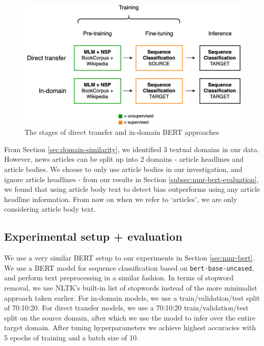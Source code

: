 \begin{figure}
    \centering
    \hspace{-1.5cm}
    \includegraphics[scale=0.3]{0-img/direct-transfer-in-domain-bert.png}
    \caption{The stages of direct transfer and in-domain BERT approaches}
    \label{fig:direct-transfer-in-domain-bert}
\end{figure}

From Section \ref{sec:domain-similarity}, we identified 3 textual domains in our data. However, news articles can be split up into 2 domains - article headlines and article bodies. We choose to only use article bodies in our investigation, and ignore article headlines - from our results in Section \ref{subsec:nmr-bert-evaluation}, we found that using article body text to detect bias outperforms using any article headline information. From now on when we refer to `articles', we are only considering article body text.

\subsection{Experimental setup + evaluation}

We use a very similar BERT setup to our experiments in Section \ref{sec:nmr-bert}. We use a BERT model for sequence classification based on \texttt{bert-base-uncased}, and perform text preprocessing in a similar fashion. In terms of stopword removal, we use NLTK's built-in list of stopwords instead of the more minimalist approach taken earlier. For in-domain models, we use a train/validation/test split of 70:10:20. For direct transfer models, we use a 70:10:20 train/validation/test split on the source domain, after which we use the model to infer over the entire target domain. After tuning hyperparameters we achieve highest accuracies with 5 epochs of training and a batch size of 10.

